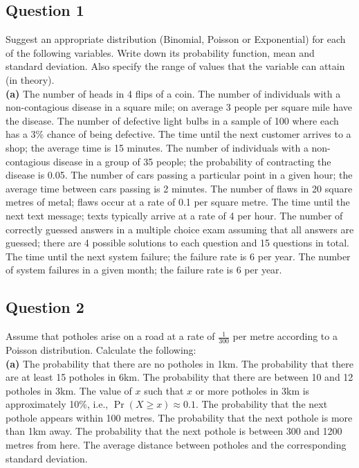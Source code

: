 \documentclass[12pt]{article}
\begin{document}
\subsection*{Question 1}
Suggest an appropriate distribution (Binomial, Poisson or Exponential) for each of the following variables. Write down its probability function, mean and standard deviation. Also specify the range of values that the variable can attain (in theory).\\[-0.2cm]

{\bf(a)} The number of heads in 4 flips of a coin.  The number of individuals with a non-contagious disease in a square mile; on average 3 people per square mile have the disease. %
 The number of defective light bulbs in a sample of 100 where each has a 3\% chance of being defective.   The time until the next customer arrives to a shop; the average time is 15 minutes.  The number of individuals with a non-contagious disease in a group of 35 people; the probability of contracting the disease is 0.05.  The number of cars passing a particular point in a given hour; the average time between cars passing is 2 minutes.  The number of flaws in 20 square metres of metal; flaws occur at a rate of 0.1 per square metre.  The time until the next text message; texts typically arrive at a rate of 4 per hour.  The number of correctly guessed answers in a multiple choice exam assuming that all answers are guessed; there are 4 possible solutions to each question and 15 questions in total.   The time until the next system failure; the failure rate is 6 per year.  The number of system failures in a given month; the failure rate is 6 per year. %


\subsection*{Question 2}
Assume that potholes arise on a road at a rate of  $\frac{1}{300}$ per metre according to a Poisson distribution. Calculate the following:\\[-0.2cm]

{\bf(a)} The probability that there are no potholes in 1km.  The probability that there are at least 15 potholes in 6km.  The probability that there are between 10 and 12 potholes in 3km.   The value of $x$ such that $x$ or more potholes in 3km is approximately 10\%, i.e., $\Pr(X \ge x) \approx 0.1$.    The probability that the next pothole appears within 100 metres.  The probability that the next pothole is more than 1km away.  The probability that the next pothole is between 300 and 1200 metres from here.   The average distance between potholes and the corresponding standard deviation.
\end{document}
